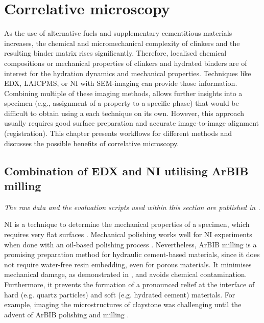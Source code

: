 \chapter{Correlative microscopy}

As the use of alternative fuels and supplementary cementitious materials increases, the chemical and micromechanical complexity of clinkers and the resulting binder matrix rises significantly.
Therefore, localised chemical compositions or mechanical properties of clinkers and hydrated binders are of interest for the hydration dynamics and mechanical properties.
Techniques like \ac{EDX}, \ac{LAICPMS}, or \ac{NI} with \ac{SEM}-imaging can provide those information.
Combining multiple of these imaging methods, allows further insights into a specimen (e.g., assignment of a property to a specific phase) that would be difficult to obtain using a each technique on its own.
However, this approach usually requires good surface preparation and accurate image-to-image alignment (registration).
This chapter presents workflows for different methods and discusses the possible benefits of correlative microscopy.

\section{Combination of \acs*{EDX} and \acl*{NI} utilising \acs*{ArBIB} milling}
\label{sec:EDX-NI}

\textit{The raw data and the evaluation scripts used within this section are published in \cite{kleiner.2026d}.}

\Acl{NI} is a technique to determine the mechanical properties of a specimen, which requires very flat surfaces \cite{wilson.2018}.
Mechanical polishing works well for \ac{NI} experiments when done with an oil-based polishing process \cite{gao.2012, wilson.2018}.
Nevertheless, \ac{ArBIB} milling is a promising preparation method for hydraulic cement-based materials, since it does not require water-free resin embedding, even for porous materials.
It minimises mechanical damage, as demonstrated in , and avoids chemical contamination.
Furthermore, it prevents the formation of a pronounced relief at the interface of hard (e.g. quartz particles) and soft (e.g. hydrated cement) materials.
For example, imaging the microstructures of claystone was challenging until the advent of \ac{ArBIB} polishing and milling \cite{yven.2007,houben.2014}.

